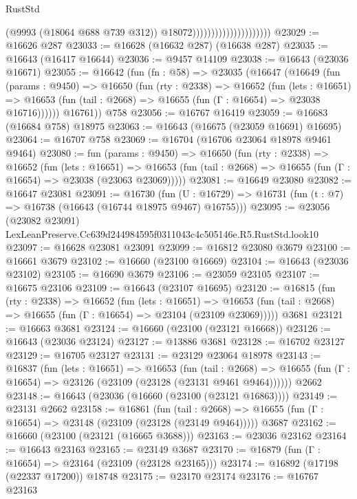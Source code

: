 \begin{lexlean}{RustStd}
\begin{coremodule}
                                              (@9993 (@18064 @688 @739 @312))
                                              @18072)))))))))))))))))))))
@23029 := @16626 @287
@23033 := @16628 (@16632 @287) (@16638 @287)
@23035 := @16643 (@16417 @16644)
@23036 := @9457 @14109
@23038 := @16643 (@23036 @16671)
@23055 := @16642
    (fun (fn : @58) =>
    @23035
      (@16647
        (@16649
          (fun (params : @9450) =>
          @16650
            (fun (rty : @2338) =>
            @16652
              (fun (lets : @16651) =>
              @16653 (fun (tail : @2668) => @16655 (fun (Γ : @16654) => @23038 @16716))))))
        @16761))
    @758
@23056 := @16767 @16419
@23059 := @16683 (@16684 @758) @18975
@23063 := @16643 (@16675 (@23059 @16691) @16695)
@23064 := @16707 @758
@23069 := @16704 (@16706 @23064 @18978 @9461 @9464)
@23080 := fun (params : @9450) =>
  @16650
    (fun (rty : @2338) =>
    @16652
      (fun (lets : @16651) =>
      @16653 (fun (tail : @2668) => @16655 (fun (Γ : @16654) => @23038 (@23063 @23069)))))
@23081 := @16649 @23080
@23082 := @16647 @23081
@23091 := @16730
    (fun (U : @16729) => @16731 (fun (t : @7) => @16738 (@16643 (@16744 @18975 @9467) @16755)))
@23095 := @23056 (@23082 @23091) LexLeanPreserve.Cc639d244984595f0311043c4c505146e.R5.RustStd.look10
@23097 := @16628 @23081 @23091
@23099 := @16812 @23080 @3679
@23100 := @16661 @3679
@23102 := @16660 (@23100 @16669)
@23104 := @16643 (@23036 @23102)
@23105 := @16690 @3679
@23106 := @23059 @23105
@23107 := @16675 @23106
@23109 := @16643 (@23107 @16695)
@23120 := @16815
    (fun (rty : @2338) =>
    @16652
      (fun (lets : @16651) =>
      @16653 (fun (tail : @2668) => @16655 (fun (Γ : @16654) => @23104 (@23109 @23069)))))
    @3681
@23121 := @16663 @3681
@23124 := @16660 (@23100 (@23121 @16668))
@23126 := @16643 (@23036 @23124)
@23127 := @13886 @3681
@23128 := @16702 @23127
@23129 := @16705 @23127
@23131 := @23129 @23064 @18978
@23143 := @16837
    (fun (lets : @16651) =>
    @16653
      (fun (tail : @2668) =>
      @16655 (fun (Γ : @16654) => @23126 (@23109 (@23128 (@23131 @9461 @9464))))))
    @2662
@23148 := @16643 (@23036 (@16660 (@23100 (@23121 @16863))))
@23149 := @23131 @2662
@23158 := @16861
    (fun (tail : @2668) => @16655 (fun (Γ : @16654) => @23148 (@23109 (@23128 (@23149 @9464)))))
    @3687
@23162 := @16660 (@23100 (@23121 (@16665 @3688)))
@23163 := @23036 @23162
@23164 := @16643 @23163
@23165 := @23149 @3687
@23170 := @16879 (fun (Γ : @16654) => @23164 (@23109 (@23128 @23165)))
@23174 := @16892 (@17198 (@22337 @17200)) @18748
@23175 := @23170 @23174
@23176 := @16767 @23163

\end{coremodule}
\end{lexlean}
